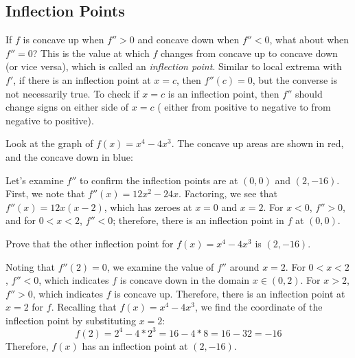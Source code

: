 \subsection{Inflection Points}
If $f$ is concave up when $f''>0$ and concave down when $f''<0$, what about 
when $f''=0$? This is the value at which $f$ changes from concave up to concave 
down (or vice versa), which is called an \textit{inflection point}. Similar to 
local extrema with $f'$, if there is an inflection point at $x=c$, then $f''(c)
=0$, but the converse is not necessarily true. To check if $x=c$ is an 
inflection point, then $f''$ should change signs on either side of $x=c$ (
either from positive to negative to from negative to positive). 

Look at the graph of $f(x) = x^4-4x^3$. The concave up areas are shown in red, 
and the concave down in blue:

\begin{figure}[htbp]
\centering
{}
\end{figure}
Let's examine $f''$ to confirm the inflection points are at $(0, 0)$ and $(2, 
-16)$. First, we note that $f''(x) = 12x^2-24x$. Factoring, we see that $f''(x) 
= 12x(x-2)$, which has zeroes at $x=0$ and $x=2$. For $x<0$, $f''>0$, and for 
$0<x<2$, $f''<0$; therefore, there is an inflection point in $f$ at $(0, 0)$. 

\begin{Exercise}[label=concavity1]
Prove that the other inflection point for $f(x) = x^4-4x^3$ is $(2, -16)$.
\end{Exercise}

\begin{Answer}[ref=concavity1]
Noting that $f''(2)=0$, we examine the value of $f''$ around $x=2$. For $0<x<2$
, $f''<0$, which indicates $f$ is concave down in the domain $x \in (0,2)$. For 
$x>2$, $f''>0$, which indicates $f$ is concave up. Therefore, there is an 
inflection point at $x=2$ for $f$. Recalling that $f(x) = x^4-4x^3$, we find 
the coordinate of the inflection point by substituting $x=2$:
$$f(2) = 2^4-4*2^3=16-4*8=16-32=-16$$
Therefore, $f(x)$ has an inflection point at $(2, -16)$.
\end{Answer}

